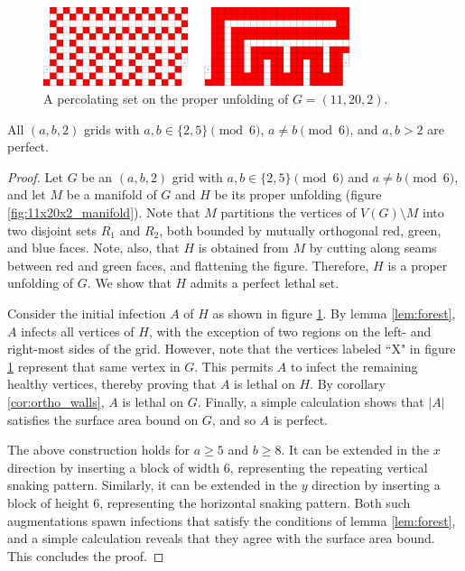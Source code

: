 \begin{figure}[]
\centering
\includegraphics[width=0.8\textwidth]{figures/7/11x20x2_unfolded_lethal.pdf}
\caption{A percolating set on the proper unfolding of $G= (11,20,2)$.}
\label{fig:11x20x2_unfolded_lethal}
\end{figure} 

\begin{con}
All $(a,b,2)$ grids with $a,b \in \{2,5\} \pmod 6$, $a \neq b \pmod 6$, and $a,b > 2$ are perfect. 
\end{con}

\begin{proof}
Let $G$ be an $(a,b,2)$ grid with $a,b \in \{2,5\} \pmod 6$ and $a \neq b \pmod 6$, and let $M$ be a manifold of $G$ and $H$ be its proper unfolding (figure \ref{fig:11x20x2_manifold}). Note that $M$ partitions the vertices of $V(G) \setminus M$ into two disjoint sets $R_1$ and $R_2$, both bounded by mutually orthogonal red, green, and blue faces. Note, also, that $H$ is obtained from $M$ by cutting along seams between red and green faces, and flattening the figure. Therefore, $H$ is a proper unfolding of $G$. We show that $H$ admits a perfect lethal set. 

Consider the initial infection $A$ of $H$ as shown in figure \ref{fig:11x20x2_unfolded_lethal}. By lemma \ref{lem:forest}, $A$ infects all vertices of $H$, with the exception of two regions on the left- and right-most sides of the grid. However, note that the vertices labeled ``X" in figure \ref{fig:11x20x2_unfolded_lethal} represent that same vertex in $G$. This permits $A$ to infect the remaining healthy vertices, thereby proving that $A$ is lethal on $H$. By corollary \ref{cor:ortho_walls}, $A$ is lethal on $G$. Finally, a simple calculation shows that $|A|$ satisfies the surface area bound on $G$, and so $A$ is perfect. 

The above construction holds for $a \geq 5$ and $b \geq 8$. It can be extended in the $x$ direction by inserting a block of width 6, representing the repeating vertical snaking pattern. Similarly, it can be extended in the $y$ direction by inserting a block of height 6, representing the horizontal snaking pattern. Both such augmentations spawn infections that satisfy the conditions of lemma \ref{lem:forest}, and a simple calculation reveals that they agree with the surface area bound. This concludes the proof. 
\end{proof}

